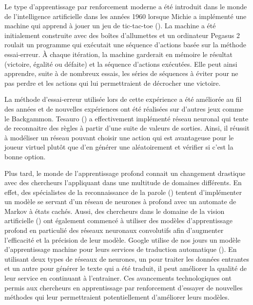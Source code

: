 \documentclass{article}
\begin{document}
Le type d'apprentissage par renforcement moderne a été introduit dans le monde de l'intelligence artificielle dans les années 1960 lorsque Michie a implémenté une machine qui apprend à jouer un jeu de tic-tac-toe (\cite{10.1093/comjnl/6.3.232}). La machine a été initialement construite avec des boîtes d'allumettes et un ordinateur Pegasus 2 roulait un programme qui exécutait une séquence d'actions basée sur la méthode essai-erreur. À chaque itération, la machine garderait en mémoire le résultat (victoire, égalité ou défaite) et la séquence d'actions exécutées. Elle peut ainsi apprendre, suite à de nombreux essais, les séries de séquences à éviter pour ne pas perdre et les actions qui lui permettraient de décrocher une victoire.
\linebreak

La méthode d'essai-erreur utilisée lors de cette expérience a été améliorée au fil des années et de nouvelles expériences ont été réalisées sur d'autres jeux comme le Backgammon. Tesauro (\cite{tesauro_sejnowski_1989}) a effectivement implémenté réseau neuronal qui tente de reconnaitre des règles à partir d'une suite de valeurs de sorties. Ainsi, il réussit à modéliser un réseau pouvant choisir une action qui est avantageuse pour le joueur virtuel plutôt que d'en générer une aléatoirement et vérifier si c'est la bonne option.
\linebreak

Plus tard, le monde de l'apprentissage profond connait un changement drastique avec des chercheurs l'appliquant dans une multitude de domaines différents. En effet, des spécialistes de la reconnaissance de la parole (\cite{dahl_yu_deng_acero_2012}) tentent d'implémenter un modèle se servant d'un réseau de neurones à  profond avec un  automate de Markov à états cachés. Aussi,  des chercheurs dans le domaine de la vision artificielle (\cite{krizhevsky_sutskever_hinton_2017}) ont également commencé à utiliser des modèles d'apprentissage profond en particulié des réseaux neuronaux convolutifs afin d'augmenter l'efficacité et la précision de leur modèle. Google utilise de nos jours un modèle d'apprentissage machine pour leurs services de traduction automatique (\cite{DBLP:journals/corr/WuSCLNMKCGMKSJL16}). En utilisant deux types de réseaux de neurones, un pour traiter les données entrantes et un autre pour générer le texte qui a été traduit, il peut améliorer la qualité de leur service en continuant à l'entrainer. Ces avancements technologiques ont permis aux chercheurs en apprentissage par renforcement d'essayer de nouvelles méthodes qui leur permettraient potentiellement d'améliorer leurs modèles.
\linebreak
\end{document}
